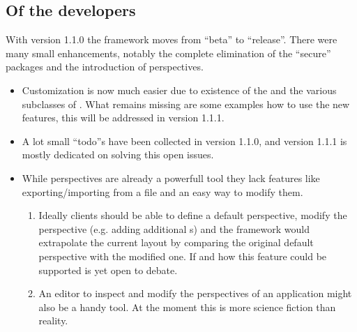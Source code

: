 \subsection{Of the developers}
With version 1.1.0 the framework moves from ``beta'' to ``release''. There were many small enhancements, notably the complete elimination of the ``secure'' packages and the introduction of perspectives.
\begin{itemize}
 \item Customization is now much easier due to existence of the  and the various subclasses of . What remains missing are some examples how to use the new features, this will be addressed in version 1.1.1.
 \item A lot small ``todo''s have been collected in version 1.1.0, and version 1.1.1 is mostly dedicated on solving this open issues.
 \item While perspectives are already a powerfull tool they lack features like exporting/importing from a file and an easy way to modify them.
 \begin{enumerate}
  \item Ideally clients should be able to define a default perspective, modify the perspective (e.g. adding additional s) and the framework would extrapolate the current layout by comparing the original default perspective with the modified one. If and how this feature could be supported is yet open to debate.
  \item An editor to inspect and modify the perspectives of an application might also be a handy tool. At the moment this is more science fiction than reality.
 \end{enumerate}
\end{itemize}
 





